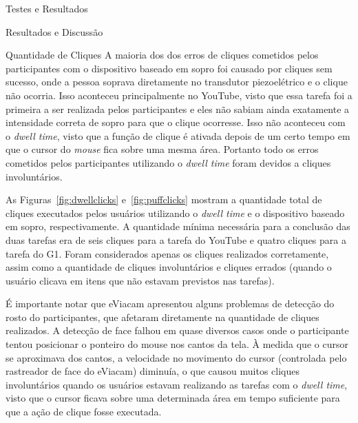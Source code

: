 \begin{chapter}{Testes e Resultados}
\begin{section}{Resultados e Discussão}
\begin{subsection}{Quantidade de Cliques}
A maioria dos dos erros de cliques cometidos pelos participantes com o
dispositivo baseado em sopro foi causado por cliques sem sucesso, onde a pessoa
soprava diretamente no transdutor piezoelétrico e o clique não ocorria. Isso
aconteceu principalmente no YouTube, visto que essa tarefa foi a primeira a ser
realizada pelos participantes e eles não sabiam ainda exatamente a intensidade
correta de sopro para que o clique ocorresse. Isso não aconteceu com o
\textit{dwell time}, visto que a função de clique é ativada depois de um certo
tempo em que o cursor do \textit{mouse} fica sobre uma mesma área. Portanto todo 
os erros cometidos pelos participantes utilizando o \textit{dwell time} foram
devidos a cliques involuntários.

As Figuras~\ref{fig:dwellclicks} e~\ref{fig:puffclicks} mostram a quantidade
total de cliques executados pelos usuários utilizando o \textit{dwell time} e o
dispositivo baseado em sopro, respectivamente. A quantidade mínima necessária
para a conclusão das duas tarefas era de seis cliques para a tarefa do YouTube e
quatro cliques para a tarefa do G1. Foram considerados apenas os cliques
realizados corretamente, assim como a quantidade de cliques involuntários e
cliques errados (quando o usuário clicava em itens que não estavam previstos nas
tarefas).


É importante notar que eViacam apresentou alguns problemas de detecção do rosto
do participantes, que afetaram diretamente na quantidade de cliques realizados.
A detecção de face falhou em quase diversos casos onde o participante tentou
posicionar o ponteiro do mouse nos cantos da tela. À medida que o cursor se
aproximava dos cantos, a velocidade no movimento do cursor (controlada pelo
rastreador de face do eViacam) diminuía, o que causou muitos cliques
involuntários quando os usuários estavam realizando as tarefas com o
\textit{dwell time}, visto que o cursor ficava sobre uma determinada área em
tempo suficiente para que a ação de clique fosse executada.


\end{subsection}
\end{section}
\end{chapter}
